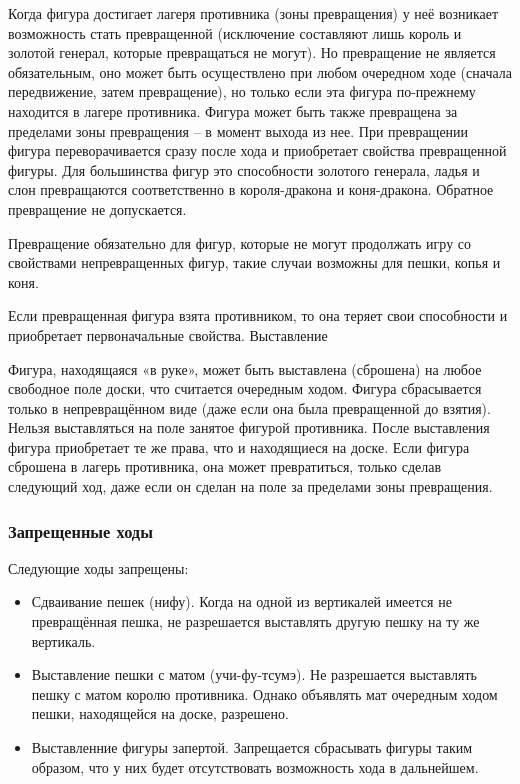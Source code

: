 Когда фигура достигает лагеря противника (зоны превращения) у неё возникает возможность стать превращенной (исключение составляют лишь король и золотой генерал, которые превращаться не могут). Но превращение не является обязательным, оно может быть осуществлено при любом очередном ходе (сначала передвижение, затем превращение), но только если эта фигура по-прежнему находится в лагере противника. Фигура может быть также превращена за пределами зоны превращения – в момент выхода из нее. При превращении фигура переворачивается сразу после хода и приобретает свойства превращенной фигуры. Для большинства фигур это способности золотого генерала, ладья и слон превращаются соответственно в короля-дракона и коня-дракона. Обратное превращение не допускается.

Превращение обязательно для фигур, которые не могут продолжать игру со свойствами непревращенных фигур, такие случаи возможны для пешки, копья и коня.

Если превращенная фигура взята противником, то она теряет свои способности и приобретает первоначальные свойства. Выставление

Фигура, находящаяся «в руке», может быть выставлена (сброшена) на любое свободное поле доски, что считается очередным ходом. Фигура сбрасывается только в непревращённом виде (даже если она была превращенной до взятия). Нельзя выставляться на поле занятое фигурой противника. После выставления фигура приобретает те же права, что и находящиеся на доске. Если фигура сброшена в лагерь противника, она может превратиться, только сделав следующий ход, даже если он сделан на поле за пределами зоны превращения.

\subsubsection{Запрещенные ходы}

Следующие ходы запрещены:

\begin{itemize}

	\item Сдваивание пешек (нифу). Когда на одной из вертикалей имеется не превращённая 		 пешка, не разрешается выставлять другую пешку на ту же вертикаль.
	
	\item Выставление пешки с матом (учи-фу-тсумэ). Не разрешается выставлять пешку с 			 матом королю противника. Однако объявлять мат очередным ходом пешки, находящейся на 		 доске, разрешено.
	
	\item Выставленние фигуры запертой. Запрещается сбрасывать фигуры таким образом, что у 	 них будет отсутствовать возможность хода в дальнейшем.
	
\end{itemize}

